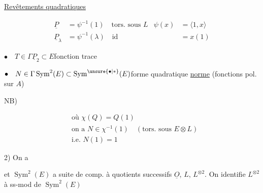 
\uline{Revêtements quadratiques}


\[
\begin{aligned}
\underline P&=\psi^{-1}(1)\quad\text{tors. sous }L &\psi(x)&=\langle1,x\rangle\\
\underline P_\lambda&=\psi^{-1}(\lambda)\quad\text{id}&&=x(1)
\end{aligned}
\]

$\bullet\quad T\in\Gamma\underline P_2\subset E$\qquad fonction trace

$\bullet\quad N\in\Gamma\operatorname{Sym}^2(E)\subset\operatorname{Sym}^{\unsure{\bullet|*}}(E)$\qquad forme quadratique \uline{norme} (fonctions pol. sur $A$)

NB)


\[
\begin{aligned}
&\text{où }\chi(Q)=Q(1)\\
&\text{on a }N\in\chi^{-1}(1)\quad(\text{tors. sous }E\otimes L)\\
&\text{i.e. }N(1)=1
\end{aligned}
\]

 2)  On a


et $\operatorname{Sym}^2(E)$ a suite de comp. à quotients successifs $\underline O$, $L$, $L^{\otimes2}$. On identifie $L^{\otimes2}$ à ss-mod de $\operatorname{Sym}^2(E)$



